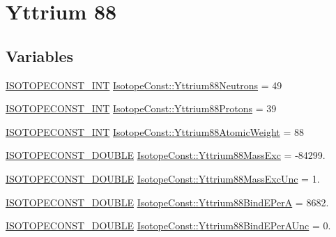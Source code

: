 \hypertarget{group___isotope_const-_yttrium-_y88}{}\section{Yttrium 88}
\label{group___isotope_const-_yttrium-_y88}
\subsection*{Variables}
\begin{DoxyCompactItemize}
\item 
\mbox{\hyperlink{group___isotope_const-_macros_ga5f18360b3e99483a35c32d789e62621c}{I\+S\+O\+T\+O\+P\+E\+C\+O\+N\+S\+T\+\_\+\+I\+NT}} \mbox{\hyperlink{group___isotope_const-_yttrium-_y88_ga41d5ff9420736dba5a623ab70f958ec2}{Isotope\+Const\+::\+Yttrium88\+Neutrons}} = 49
\item 
\mbox{\hyperlink{group___isotope_const-_macros_ga5f18360b3e99483a35c32d789e62621c}{I\+S\+O\+T\+O\+P\+E\+C\+O\+N\+S\+T\+\_\+\+I\+NT}} \mbox{\hyperlink{group___isotope_const-_yttrium-_y88_ga4c0a31702c35bfc2cc1c0651fc048d98}{Isotope\+Const\+::\+Yttrium88\+Protons}} = 39
\item 
\mbox{\hyperlink{group___isotope_const-_macros_ga5f18360b3e99483a35c32d789e62621c}{I\+S\+O\+T\+O\+P\+E\+C\+O\+N\+S\+T\+\_\+\+I\+NT}} \mbox{\hyperlink{group___isotope_const-_yttrium-_y88_ga7f4c0aed787792dc31cf90692fb7e276}{Isotope\+Const\+::\+Yttrium88\+Atomic\+Weight}} = 88
\item 
\mbox{\hyperlink{group___isotope_const-_macros_ga8f45a7272ce02c0b4c65c44636ed719a}{I\+S\+O\+T\+O\+P\+E\+C\+O\+N\+S\+T\+\_\+\+D\+O\+U\+B\+LE}} \mbox{\hyperlink{group___isotope_const-_yttrium-_y88_ga8de31bc72ec78942a984540e048a074f}{Isotope\+Const\+::\+Yttrium88\+Mass\+Exc}} = -\/84299.
\item 
\mbox{\hyperlink{group___isotope_const-_macros_ga8f45a7272ce02c0b4c65c44636ed719a}{I\+S\+O\+T\+O\+P\+E\+C\+O\+N\+S\+T\+\_\+\+D\+O\+U\+B\+LE}} \mbox{\hyperlink{group___isotope_const-_yttrium-_y88_ga2f3b18e99e3fe6a1d5d747da55159fad}{Isotope\+Const\+::\+Yttrium88\+Mass\+Exc\+Unc}} = 1.
\item 
\mbox{\hyperlink{group___isotope_const-_macros_ga8f45a7272ce02c0b4c65c44636ed719a}{I\+S\+O\+T\+O\+P\+E\+C\+O\+N\+S\+T\+\_\+\+D\+O\+U\+B\+LE}} \mbox{\hyperlink{group___isotope_const-_yttrium-_y88_ga1d9e79514d6cfded85db98ce5de1b86d}{Isotope\+Const\+::\+Yttrium88\+Bind\+E\+PerA}} = 8682.
\item 
\mbox{\hyperlink{group___isotope_const-_macros_ga8f45a7272ce02c0b4c65c44636ed719a}{I\+S\+O\+T\+O\+P\+E\+C\+O\+N\+S\+T\+\_\+\+D\+O\+U\+B\+LE}} \mbox{\hyperlink{group___isotope_const-_yttrium-_y88_gae24110fc4194e9bbfa46c33e3ccc2192}{Isotope\+Const\+::\+Yttrium88\+Bind\+E\+Per\+A\+Unc}} = 0.

\end{DoxyCompactItemize}

